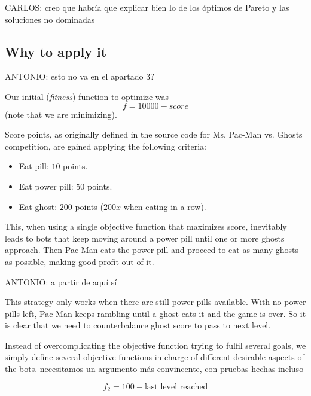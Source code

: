 \documentclass{llncs}
\newcommand{\pacman}{Ms. Pac-Man vs. Ghosts }
\newcommand{\paco}{Pac-Man }
\begin{document}
{\color{red}CARLOS: creo que habría que explicar bien lo de los óptimos de Pareto y las soluciones no dominadas}



\subsection{Why to apply it}

{\color{red}ANTONIO: esto no va en el apartado 3?}

Our initial (\textit{fitness}) function to optimize was
\begin{equation} %
f = 10000 - score
\end{equation}
(note that we are minimizing).

Score points, as originally defined in the source code for \pacman competition, are gained applying the following criteria:
\begin{itemize}
\label{vanilla_pacman_score}
\item Eat pill: $10$ points.
\item Eat power pill: $50$ points.
\item Eat ghost: $200$ points ($200x$ when eating in a row).
\end{itemize}

This, when using a single objective function that maximizes score, inevitably leads to bots that keep moving around a power pill until one or more ghosts approach. Then \paco eats the power pill and proceed to eat as many ghosts as possible, making good profit out of it.

{\color{red}ANTONIO: a partir de aquí sí}

This strategy only works when there are still power pills available. With no power pills left, \paco keeps rambling until a ghost eats it and the game is over. So it is clear that we need to counterbalance ghost score to pass to next level.

Instead of overcomplicating the objective function trying to fulfil several goals, we simply define several objective functions in charge of different desirable aspects of the bots.
{\color{red} necesitamos un argumento más convincente, con pruebas hechas incluso}

\begin{equation}
f_2 = 100 - \text{last level reached}
\end{equation}
\end{document}
